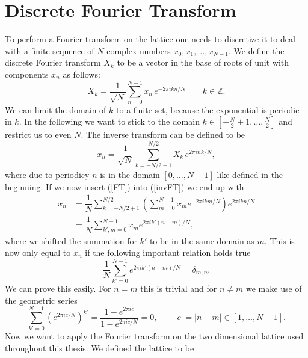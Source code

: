 \section{Discrete Fourier Transform}
\label{app: disc_ft}
To perform a Fourier transform on the lattice one needs to discretize it to deal with a finite sequence of $N$ complex numbers $x_{0},x_{1},\ldots,x_{N-1}$. We define the discrete Fourier transform $X_{k}$ to be a vector in the base of roots of unit with components $x_{n}$ as follows:
\begin{equation}
X_{k}=\dfrac{1}{\sqrt{N}} \sum\limits_{n=0}^{N-1} x_{n} \, e ^{-2\pi  i kn /N} \qquad  k \in \mathbb{Z}.
\label{FT}
\end{equation}
We can limit the domain of $k$ to a finite set, because the exponential is periodic in $k$. In the following we want to stick to the domain $k \in \left[ -\tfrac{N}{2}+1,\ldots,\tfrac{N}{2} \right]$ and restrict us to even $N$. The inverse transform can be defined to be
%
\begin{equation}
 x_{n}= \dfrac{1}{\sqrt{N}} \sum\limits_{k=-N/2+1}^{N/2} X_{k} \, e ^{2 \pi  i nk /N},
 \label{invFT}
 \end{equation}
 where due to periodicy $n$ is in the domain $\left[0,\ldots,N-1\right]$ like defined in the beginning. If we now insert (\ref{FT}) into (\ref{invFT}) we end up with
\begin{align}
x_{n} &=\dfrac{1}{N}\sum\limits_{k=-N/2+1}^{N/2} \left( \sum\limits_{m=0}^{N-1} x_{m}  e ^{-2\pi  i km /N} \right)  e ^{2\pi  i kn /N} \\
%
%
&= \dfrac{1}{N} \sum\limits_{k',m=0}^{N-1} x_{m}  e ^{2\pi  i k'(n-m) /N},
\end{align}
where we shifted the summation for $k'$ to be in the same domain as $m$. This is now only equal to $x_{n}$ if the following important relation holds true
%
%
\begin{equation}
\dfrac{1}{N} \sum\limits_{k'=0}^{N-1}  e ^{2\pi  i k'(n-m) /N} = \delta_{m,n}.
\end{equation}
We can prove this easily. For $n=m$ this is trivial and for $n\neq m$ we make use of the geometric series
\begin{equation}
\sum\limits_{k'=0}^{N-1} \left( e ^{2\pi i  c/N }\right)^{k'} = \dfrac{1- e ^{2\pi i  c}}{1- e ^{2\pi i  c/N }} = 0, \qquad  \vert c\vert = \vert n-m \vert \in [1,\ldots,N-1].
\end{equation}
%
%
Now we want to apply the Fourier transform on the two dimensional lattice used throughout this thesis. We defined the lattice to be
